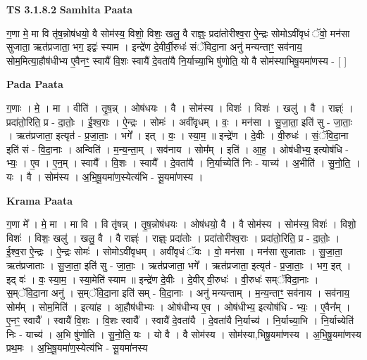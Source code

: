 \documentclass[17pt]{extarticle}
\begin{document}
\textbf{TS 3.1.8.2 } \newline
\textbf{Samhita Paata} \newline

ग॒णा मे॒ मा वि तृ॑ष॒न्नोष॑धयो॒ वै सोम॑स्य॒ विशो॒ विशः॒ खलु॒ वै राज्ञ्ः॒ प्रदा॑तोरीश्व॒रा ऐ॒न्द्रः सोमोऽवी॑वृधं ॅवो॒ मन॑सा सुजाता॒ ऋत॑प्रजाता॒ भग॒ इद्वः॑ स्याम । इन्द्रे॑ण दे॒वीर्वी॒रुधः॑ संॅविदा॒ना अनु॑ मन्यन्ताꣳ॒॒ सव॑नाय॒ सोम॒मित्या॒हौष॑धीभ्य ए॒वैनꣳ॒॒ स्वायै॑ वि॒शः स्वायै॑ दे॒वता॑यै नि॒र्याच्या॒भि षु॑णोति॒ यो वै सोम॑स्याभिषू॒यमा॑णस्य - [  ] \newline

\textbf{Pada Paata} \newline

ग॒णाः । मे॒ । मा । वीति॑ । तृ॒ष॒न्न् । ओष॑धयः । वै । सोम॑स्य । विशः॑ । विशः॑ । खलु॑ । वै । राज्ञ्ः॑ । प्रदा॑तो॒रिति॒ प्र - दा॒तोः॒ । ई॒श्व॒राः । ऐ॒न्द्रः । सोमः॑ । अवी॑वृधम् । वः॒ । मन॑सा । सु॒जा॒ता॒ इति॑ सु - जा॒ताः॒ । ऋत॑प्रजाता॒ इत्यृत॑ - प्र॒जा॒ताः॒ । भगे᳚ । इत् । वः॒ । स्या॒म॒ ॥ इन्द्रे॑ण । दे॒वीः । वी॒रुधः॑ । सं॒ॅवि॒दा॒ना इति॑ सं - वि॒दा॒नाः । अन्विति॑ । म॒न्य॒न्ता॒म् । सव॑नाय । सोम᳚म् । इति॑ । आ॒ह॒ । ओष॑धीभ्य॒ इत्योष॑धि - भ्यः॒ । ए॒व । ए॒न॒म् । स्वायै᳚ । वि॒शः । स्वायै᳚ । दे॒वता॑यै । नि॒र्याच्येति॑ निः - याच्य॑ । अ॒भीति॑ । सु॒नो॒ति॒ । यः । वै । सोम॑स्य । अ॒भि॒षू॒यमा॑ण॒स्येत्य॑भि - सू॒यमा॑णस्य ।  \newline


\textbf{Krama Paata} \newline

ग॒णा मे᳚ । मे॒ मा । मा वि । वि तृ॑षन्न् । तृ॒ष॒न्नोष॑धयः । ओष॑धयो॒ वै । वै सोम॑स्य । सोम॑स्य॒ विशः॑ । विशो॒ विशः॑ । विशः॒ खलु॑ । खलु॒ वै । वै राज्ञ्ः॑ । राज्ञ्ः॒ प्रदा॑तोः । प्रदा॑तोरीश्व॒राः । प्रदा॑तो॒रिति॒ प्र - दा॒तोः॒ । ई॒श्व॒रा ऐ॒न्द्रः । ऐ॒न्द्रः सोमः॑ । सोमोऽवी॑वृधम् । अवी॑वृधं ॅवः । वो॒ मन॑सा । मन॑सा सुजाताः । सु॒जा॒ता॒ ऋत॑प्रजाताः । सु॒जा॒ता॒ इति॑ सु - जा॒ताः॒ । ऋत॑प्रजाता॒ भगे᳚ । ऋत॑प्रजाता॒ इत्यृत॑ - प्र॒जा॒ताः॒ । भग॒ इत् । इद् वः॑ । वः॒ स्या॒म॒ । स्या॒मेति॑ स्याम ॥ इन्द्रे॑ण दे॒वीः । दे॒वीर् वी॒रुधः॑ । वी॒रुधः॑ सम्ॅविदा॒नाः । स॒म्ॅवि॒दा॒ना अनु॑ । स॒म्ॅवि॒दा॒ना इति॑ सम् - वि॒दा॒नाः । अनु॑ मन्यन्ताम् । म॒न्य॒न्ताꣳ॒॒ सव॑नाय । सव॑नाय॒ सोम᳚म् । सोम॒मिति॑ । इत्या॑ह । आ॒हौष॑धीभ्यः । ओष॑धीभ्य ए॒व । ओष॑धीभ्य॒ इत्योष॑धि - भ्यः॒ । ए॒वैन᳚म् । ए॒नꣳ॒॒ स्वायै᳚ । स्वायै॑ वि॒शः । वि॒शः स्वायै᳚ । स्वायै॑ दे॒वता॑यै । दे॒वता॑यै नि॒र्याच्य॑ । नि॒र्याच्या॒भि । नि॒र्याच्येति॑ निः - याच्य॑ । अ॒भि षु॑णोति । सु॒नो॒ति॒ यः । यो वै । वै सोम॑स्य । सोम॑स्या,भिषू॒यमा॑णस्य । अ॒भि॒षू॒यमा॑णस्य प्रथ॒मः । अ॒भि॒षू॒यमा॑ण॒स्येत्य॑भि - सू॒यमा॑नस्य \newline
\end{document}
